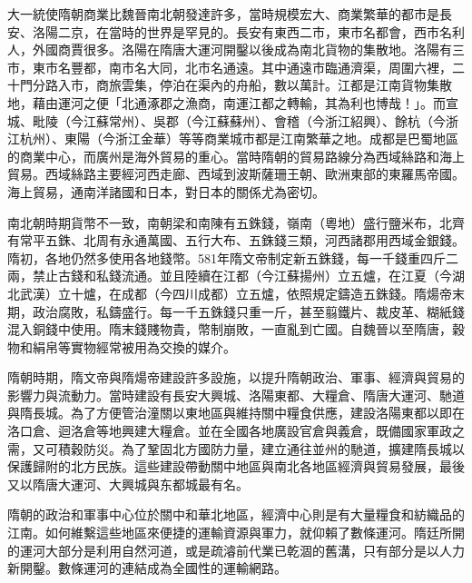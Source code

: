 大一統使隋朝商業比魏晉南北朝發達許多，當時規模宏大、商業繁華的都市是長安、洛陽二京，在當時的世界是罕見的。長安有東西二市，東市名都會，西市名利人，外國商賈很多。洛陽在隋唐大運河開鑿以後成為南北貨物的集散地。洛陽有三市，東市名豐都，南市名大同，北市名通遠。其中通遠市臨通濟渠，周圍六裡，二十門分路入市，商旅雲集，停泊在渠內的舟船，數以萬計。江都是江南貨物集散地，藉由運河之便「北通涿郡之漁商，南運江都之轉輸，其為利也博哉！」。而宣城、毗陵（今江蘇常州）、吳郡（今江蘇蘇州）、會稽（今浙江紹興）、餘杭（今浙江杭州）、東陽（今浙江金華）等等商業城市都是江南繁華之地。成都是巴蜀地區的商業中心，而廣州是海外貿易的重心。當時隋朝的貿易路線分為西域絲路和海上貿易。西域絲路主要經河西走廊、西域到波斯薩珊王朝、歐洲東部的東羅馬帝國。海上貿易，通南洋諸國和日本，對日本的關係尤為密切。

南北朝時期貨幣不一致，南朝梁和南陳有五銖錢，嶺南（粵地）盛行鹽米布，北齊有常平五銖、北周有永通萬國、五行大布、五銖錢三類，河西諸郡用西域金銀錢。隋初，各地仍然多使用各地錢幣。581年隋文帝制定新五銖錢，每一千錢重四斤二兩，禁止古錢和私錢流通。並且陸續在江都（今江蘇揚州）立五爐，在江夏（今湖北武漢）立十爐，在成都（今四川成都）立五爐，依照規定鑄造五銖錢。隋煬帝末期，政治腐敗，私鑄盛行。每一千五銖錢只重一斤，甚至翦鐵片、裁皮革、糊紙錢混入銅錢中使用。隋末錢賤物貴，幣制崩敗，一直亂到亡國。自魏晉以至隋唐，穀物和絹帛等實物經常被用為交換的媒介。

隋朝時期，隋文帝與隋煬帝建設許多設施，以提升隋朝政治、軍事、經濟與貿易的影響力與流動力。當時建設有長安大興城、洛陽東都、大糧倉、隋唐大運河、馳道與隋長城。為了方便管治潼關以東地區與維持關中糧食供應，建設洛陽東都以即在洛口倉、迴洛倉等地興建大糧倉。並在全國各地廣設官倉與義倉，既備國家軍政之需，又可積穀防災。為了鞏固北方國防力量，建立通往並州的馳道，擴建隋長城以保護歸附的北方民族。這些建設帶動關中地區與南北各地區經濟與貿易發展，最後又以隋唐大運河、大興城與东都城最有名。

隋朝的政治和軍事中心位於關中和華北地區，經濟中心則是有大量糧食和紡織品的江南。如何維繫這些地區來便捷的運輸資源與軍力，就仰賴了數條運河。隋廷所開的運河大部分是利用自然河道，或是疏濬前代業已乾涸的舊溝，只有部分是以人力新開鑿。數條運河的連結成為全國性的運輸網路。

